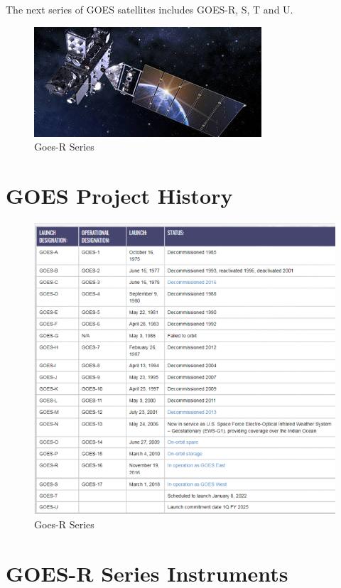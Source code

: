 The next series of GOES satellites includes GOES-R, S, T and U.
\begin{figure}[H]
\begin{center}
\includegraphics[scale=0.8]{goes-r_main_earth_reflection_panel_image.jpg} %
\end{center}
\caption{Goes-R Series}
\label{Goes-R Series}%
\end{figure}
\section{GOES Project History}
\begin{figure}[H]
\begin{center}
\includegraphics[scale=0.8]{image5.png} %
\end{center}
\caption{Goes-R Series}
\label{Goes-R Series}%
\end{figure}
\section{GOES-R Series Instruments}
